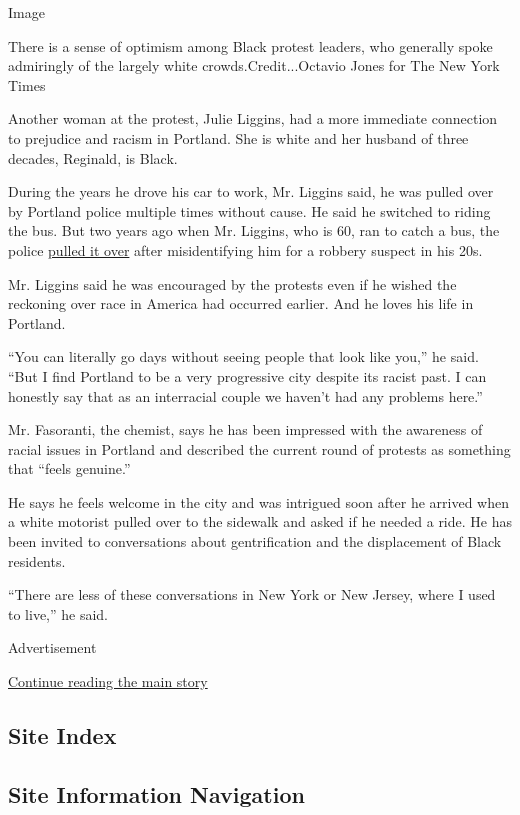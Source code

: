 Image

There is a sense of optimism among Black protest leaders, who generally
spoke admiringly of the largely white crowds.Credit...Octavio Jones for
The New York Times

Another woman at the protest, Julie Liggins, had a more immediate
connection to prejudice and racism in Portland. She is white and her
husband of three decades, Reginald, is Black.

During the years he drove his car to work, Mr. Liggins said, he was
pulled over by Portland police multiple times without cause. He said he
switched to riding the bus. But two years ago when Mr. Liggins, who is
60, ran to catch a bus, the police
\href{https://katu.com/news/local/beaverton-police-launch-investigation-into-possible-case-of-racial-profiling-reggie-liggins}{pulled
it over} after misidentifying him for a robbery suspect in his 20s.

Mr. Liggins said he was encouraged by the protests even if he wished the
reckoning over race in America had occurred earlier. And he loves his
life in Portland.

``You can literally go days without seeing people that look like you,''
he said. ``But I find Portland to be a very progressive city despite its
racist past. I can honestly say that as an interracial couple we haven't
had any problems here.''

Mr. Fasoranti, the chemist, says he has been impressed with the
awareness of racial issues in Portland and described the current round
of protests as something that ``feels genuine.''

He says he feels welcome in the city and was intrigued soon after he
arrived when a white motorist pulled over to the sidewalk and asked if
he needed a ride. He has been invited to conversations about
gentrification and the displacement of Black residents.

``There are less of these conversations in New York or New Jersey, where
I used to live,'' he said.

Advertisement

\protect\hyperlink{after-bottom}{Continue reading the main story}

\hypertarget{site-index}{%
\subsection{Site Index}\label{site-index}}

\hypertarget{site-information-navigation}{%
\subsection{Site Information
Navigation}\label{site-information-navigation}}

